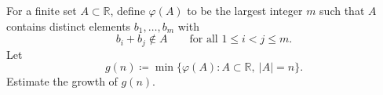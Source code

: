 For a finite set $A\subset\mathbb{R}$, define $\varphi(A)$ to be the largest integer $m$ such that $A$ contains distinct elements $b_1,\dots,b_m$ with
\[
 b_i+b_j\notin A\qquad\text{for all }1\le i<j\le m.
\]
Let
\[
 g(n)\coloneqq \min\{\varphi(A): A\subset\mathbb{R},\ |A|=n\}.
\]
Estimate the growth of $g(n)$.
